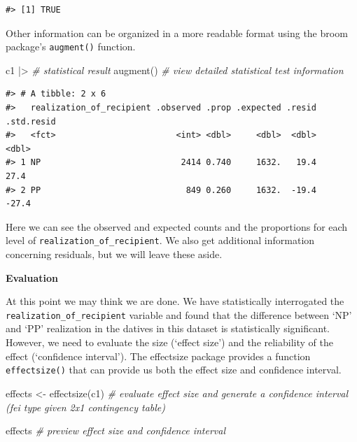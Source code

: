 \documentclass[
  letterpaper,
]{scrbook}
\newenvironment{Shaded}{\begin{snugshade}}{\end{snugshade}}
\newcommand{\CommentTok}[1]{\textcolor[rgb]{0.00,0.00,0.00}{\textit{#1}}}
\newcommand{\FunctionTok}[1]{\textcolor[rgb]{0.00,0.00,0.00}{#1}}
\newcommand{\NormalTok}[1]{\textcolor[rgb]{0.00,0.00,0.00}{#1}}
\newcommand{\OtherTok}[1]{\textcolor[rgb]{0.00,0.00,0.00}{#1}}
\newcommand{\SpecialCharTok}[1]{\textcolor[rgb]{0.00,0.00,0.00}{#1}}
\begin{document}
\begin{verbatim}
#> [1] TRUE
\end{verbatim}

Other information can be organized in a more readable format using the
broom package's \texttt{augment()} function.

\begin{Shaded}
\begin{Highlighting}[]
\NormalTok{c1 }\SpecialCharTok{|\textgreater{}} \CommentTok{\# statistical result}
  \FunctionTok{augment}\NormalTok{() }\CommentTok{\# view detailed statistical test information}
\end{Highlighting}
\end{Shaded}

\begin{verbatim}
#> # A tibble: 2 x 6
#>   realization_of_recipient .observed .prop .expected .resid .std.resid
#>   <fct>                        <int> <dbl>     <dbl>  <dbl>      <dbl>
#> 1 NP                            2414 0.740     1632.   19.4       27.4
#> 2 PP                             849 0.260     1632.  -19.4      -27.4
\end{verbatim}

Here we can see the observed and expected counts and the proportions for
each level of \texttt{realization\_of\_recipient}. We also get
additional information concerning residuals, but we will leave these
aside.

\textbf{Evaluation}

At this point we may think we are done. We have statistically
interrogated the \texttt{realization\_of\_recipient} variable and found
that the difference between `NP' and `PP' realization in the datives in
this dataset is statistically significant. However, we need to evaluate
the size (`effect size') and the reliability of the effect (`confidence
interval'). The effectsize package provides a function
\texttt{effectsize()} that can provide us both the effect size and
confidence interval.

\begin{Shaded}
\begin{Highlighting}[]
\NormalTok{effects }\OtherTok{\textless{}{-}} 
  \FunctionTok{effectsize}\NormalTok{(c1) }\CommentTok{\# evaluate effect size and generate a confidence interval (fei type given 2x1 contingency table)}

\NormalTok{effects }\CommentTok{\# preview effect size and confidence interval}
\end{Highlighting}
\end{Shaded}
\end{document}
